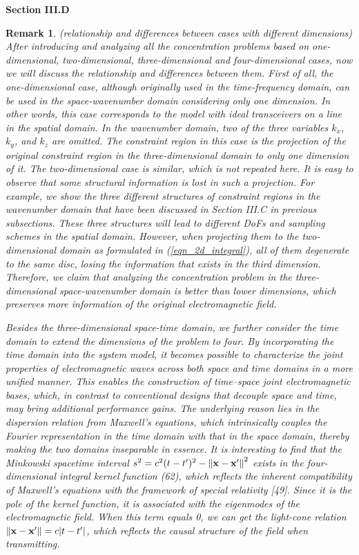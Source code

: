 \documentclass[a4paper,12pt]{article}
\newtheorem{remark}{\bf Remark}
\begin{document}
\begin{framed}
	{\bf Section III.D}

{\color{red}
	\setcounter{remark}{7} 
	\begin{remark}
		(relationship and differences between cases with different dimensions) After introducing and analyzing all the concentration problems based on one-dimensional, two-dimensional, three-dimensional and four-dimensional cases, now we will discuss the relationship and differences between them. First of all, the one-dimensional case, although originally used in the time-frequency domain, can be used in the space-wavenumber domain considering only one dimension. In other words, this case corresponds to the model with ideal transceivers on a line in the spatial domain. In the wavenumber domain, two of the three variables $k_x$, $k_y$, and $k_z$ are omitted. The constraint region in this case is the projection of the original constraint region in the three-dimensional domain to only one dimension of it. The two-dimensional case is similar, which is not repeated here. It is easy to observe that some structural information is lost in such a projection. For example, we show the three different structures of constraint regions in the wavenumber domain that have been discussed in Section III.C in previous subsections. These three structures will lead to different DoFs and sampling schemes in the spatial domain. However, when projecting them to the two-dimensional domain as formulated in (\ref{eqn_2d_integral}), all of them degenerate to the same disc, losing the information that exists in the third dimension. Therefore, we claim that analyzing the concentration problem in the three-dimensional space-wavenumber domain is better than lower dimensions, which preserves more information of the original electromagnetic field. 
		
		Besides the three-dimensional space-time domain, we further consider the time domain to extend the dimensions of the problem to four. By incorporating the time domain into the system model, it becomes possible to characterize the joint properties of electromagnetic waves across both space and time domains in a more unified manner. This enables the construction of time–space joint electromagnetic bases, which, in contrast to conventional designs that decouple space and time, may bring additional performance gains. The underlying reason lies in the dispersion relation from Maxwell's equations, which intrinsically couples the Fourier representation in the time domain with that in the space domain, thereby making the two domains inseparable in essence. It is interesting to find that the Minkowski spacetime interval $s^2 = c^2(t-t')^2 - \left\| {\bf x}-{\bf x}' \right\|^2$ exists in the four-dimensional integral kernel function (62), which reflects the inherent compatibility of Maxwell’s equations with the framework of special relativity [49]. Since it is the pole of the kernel function, it is associated with the eigenmodes of the electromagnetic field. When this term equals 0, we can get the light-cone relation $\left\| {\bf x}-{\bf x}' \right\|= c|t-t'|$, which reflects the causal structure of the field when transmitting.
		

\end{remark}}
\end{framed}
\end{document}
